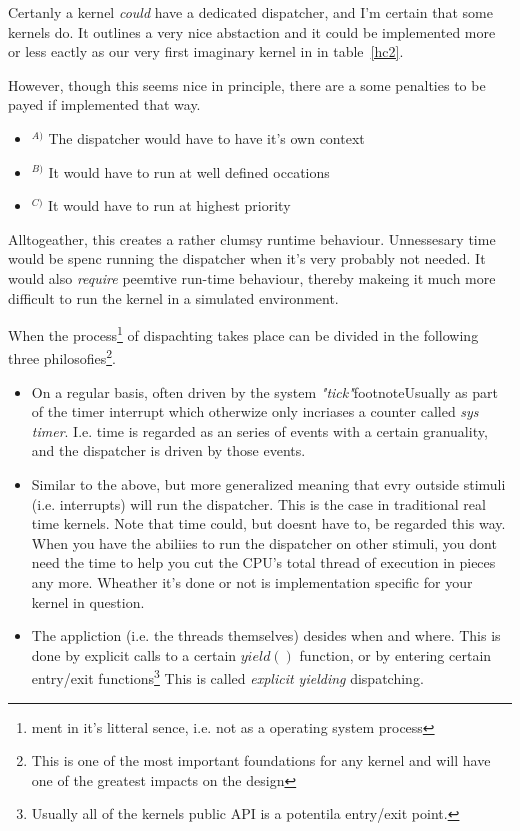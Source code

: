 Certanly a kernel \textit{could} have a dedicated dispatcher, and I'm certain that some kernels do. It outlines a very nice abstaction and it could be implemented more or less eactly as our very first imaginary kernel in in table~\ref{hc2}.

However, though this seems nice in principle, there are a some penalties to be payed if implemented that way.
\begin{itemize}
	\item $^{A)}$ The dispatcher would have to have it's own context
	\item $^{B)}$ It would have to run at well defined occations
	\item $^{C)}$ It would have to run at highest priority
\end{itemize}
Alltogeather, this creates a rather clumsy runtime behaviour. Unnessesary time would be spenc running the dispatcher when it's very probably not needed. It would also \textit{require} peemtive run-time behaviour, thereby makeing it much more difficult to run the kernel in a simulated environment.

When the process\footnote{ment in it's litteral sence, i.e. not as a operating system process} of dispachting takes place can be divided in the following three philosofies\footnote{This is one of the most important foundations for any  kernel and will have one of the greatest impacts on the design}.
\begin{itemize}
	\item On a regular basis, often driven by the system \textit{"tick"}footnote{Usually as part of the timer interrupt which otherwize only incriases a counter called \textit{sys timer}}. I.e. time is regarded as an series of events with a certain granuality, and the dispatcher is driven by those events.
	\item Similar to the above, but more generalized meaning that evry outside stimuli (i.e. interrupts) will run the dispatcher. This is the case in traditional real time kernels. Note that time could, but doesnt have to, be regarded this way. When you have the abiliies to run the dispatcher on other stimuli, you dont need the time to help you cut the CPU's total thread of execution in pieces any more. Wheather it's done or not is implementation specific for your kernel in question.
	\item The appliction (i.e. the threads themselves) desides when and where. This is done by explicit calls to a certain $yield()$ function, or by entering certain entry/exit functions\footnote{Usually all of the kernels public API is a potentila entry/exit point.}  This is called \textit{explicit yielding} dispatching.
\end{itemize}


